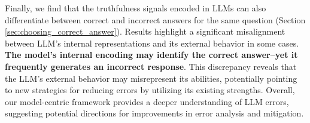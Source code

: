 Finally, we find that the truthfulness signals encoded in LLMs can also differentiate between correct and incorrect answers for the same question (Section \ref{sec:choosing_correct_answer}).
Results highlight a significant misalignment between LLM's internal representations and its external behavior in some cases.
\textbf{The model's internal encoding may identify the correct answer--yet it frequently generates an incorrect response}.
This discrepancy reveals that the LLM’s external behavior may misrepresent its abilities, potentially pointing to new strategies for reducing errors by utilizing its existing strengths.
Overall, our model-centric framework provides a deeper understanding of LLM errors, suggesting potential directions for improvements in error analysis and mitigation.